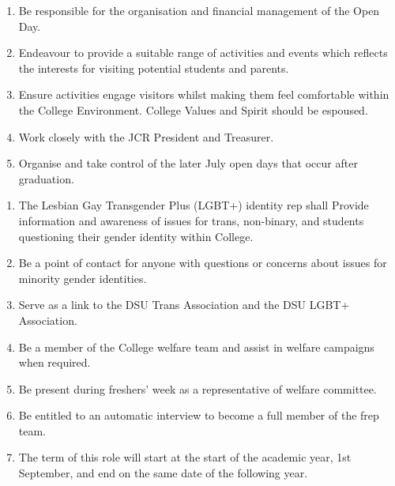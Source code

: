 \begin{enumerate}
    \item Be responsible for the organisation and financial management of the Open Day.
    \item Endeavour to provide a suitable range of activities and events which reflects the interests for visiting potential students and parents.
    \item Ensure activities engage visitors whilst making them feel comfortable within the College Environment. College Values and Spirit should be espoused.
    \item Work closely with the JCR President and Treasurer.
    \item Organise and take control of the later July open days that occur after graduation.
    
\end{enumerate}

\begin{enumerate}
    \item The Lesbian Gay Transgender Plus (LGBT+) identity rep shall Provide information and awareness of issues for trans, non-binary, and students questioning their gender identity within College.
    \item Be a point of contact for anyone with questions or concerns about issues for minority gender identities.
    \item Serve as a link to the DSU Trans Association and the DSU LGBT+ Association.
    \item Be a member of the College welfare team and assist in welfare campaigns when required.
    \item Be present during freshers’ week as a representative of welfare committee.
    \item Be entitled to an automatic interview to become a full member of the frep team. 
    \item The term of this role will start at the start of the academic year, 1st September, and end on the same date of the following year.
    
\end{enumerate}

